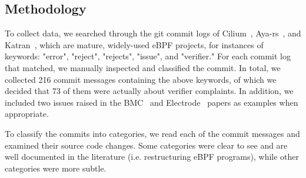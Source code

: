 
\subsection{Methodology}
To collect data, we searched through the git commit logs of Cilium~\cite{cilium}, Aya-rs~\cite{aya-rs}, and
    Katran~\cite{katran}, which are mature, widely-used eBPF projects, for instances of
    keywords: "error", "reject", "rejects", "issue", and "verifier."
For each commit log that matched, we manually inspected and classified the commit.
In total, we collected 216 commit messages containing the above keywords, of which we decided that 73 of them were actually about verifier complaints.
In addition, we included two issues raised in the BMC~\cite{BMC} and Electrode~\cite{Electrode} papers as examples when appropriate.


To classify the commits into categories, we read each of the commit messages and examined
    their source code changes.
Some categories were clear to see and are well documented in the literature (i.e. restructuring eBPF programs), while other categories were more subtle.


